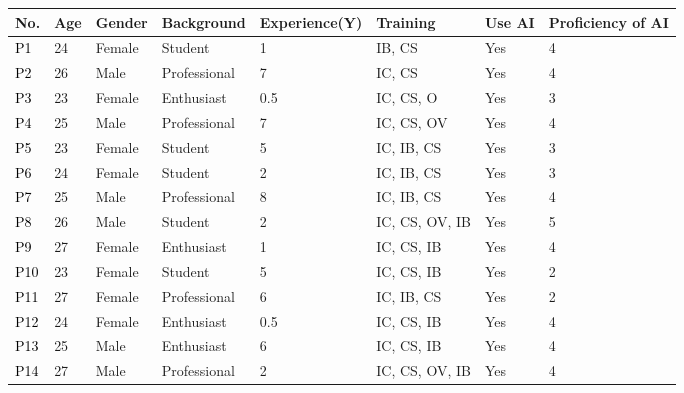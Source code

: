 \begin{table*}
\label{tab:participant_data}
\begin{tabular}{|p{0.8cm}|p{0.8cm}|p{1.1cm}|p{1.7cm}|p{2.2cm}|p{2cm}|p{1.1cm}|p{2.5cm}|}


\hline
\textbf{No.} & \textbf{Age} & \textbf{Gender} & \textbf{Background}   & \textbf{Experience(Y)} & \textbf{Training}       & \textbf{Use AI} & \textbf{Proficiency of AI} \\ \hline
\textcolor{black}{P1}  & 24  & Female & Student      & 1             & IB, CS         & Yes    & 4                 \\ \hline
\textcolor{black}{P2}  & 26  & Male   & Professional & 7             & IC, CS         & Yes    & 4                 \\ \hline
\textcolor{black}{P3}  & 23  & Female & Enthusiast   & 0.5           & IC, CS, O      & Yes    & 3                 \\ \hline
\textcolor{black}{P4}  & 25  & Male   & Professional & 7             & IC, CS, OV     & Yes    & 4                 \\ \hline
\textcolor{black}{P5}  & 23  & Female & Student      & 5             & IC, IB, CS     & Yes    & 3                 \\ \hline
\textcolor{black}{P6}  & 24  & Female & Student      & 2             & IC, IB, CS     & Yes    & 3                 \\ \hline
\textcolor{black}{P7}  & 25  & Male   & Professional & 8             & IC, IB, CS     & Yes    & 4                 \\ \hline
\textcolor{black}{P8}  & 26  & Male   & Student      & 2             & IC, CS, OV, IB & Yes    & 5                 \\ \hline
\textcolor{black}{P9}  & 27  & Female & Enthusiast   & 1             & IC, CS, IB     & Yes    & 4                 \\ \hline
\textcolor{black}{P10} & 23  & Female & Student      & 5             & IC, CS, IB     & Yes    & 2                 \\ \hline
\textcolor{black}{P11} & 27  & Female & Professional & 6             & IC, IB, CS     & Yes    & 2                 \\ \hline
\textcolor{black}{P12} & 24  & Female & Enthusiast   & 0.5           & IC, CS, IB     & Yes    & 4                 \\ \hline
\textcolor{black}{P13} & 25  & Male   & Enthusiast   & 6             & IC, CS, IB     & Yes    & 4                 \\ \hline
\textcolor{black}{P14} & 27  & Male   & Professional & 2             & IC, CS, OV, IB & Yes    & 4                 \\ \hline

\end{tabular}
\end{table*}
